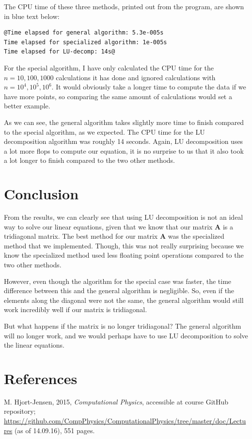\documentclass[12pt]{article}
\begin{document}
The CPU time of these three methods, printed out from the program, are shown in blue text below:
\begin{lstlisting}
@Time elapsed for general algorithm: 5.3e-005s
Time elapsed for specialized algorithm: 1e-005s
Time elapsed for LU-decomp: 14s@
\end{lstlisting}
For the special algorithm, I have only calculated the CPU time for the $n=10,100,1000$ calculations it has done and ignored calculations with $n=10^4, 10^5, 10^6$. It would obviously take a longer time to compute the data if we have more points, so comparing the same amount of calculations would set a better example.

As we can see, the general algorithm takes slightly more time to finish compared to the special algorithm, as we expected. The CPU time for the LU decomposition algorithm was roughly 14 seconds. Again, LU decomposition uses a lot more flops to compute our equation, it is no surprise to us that it also took a lot longer to finish compared to the two other methods.

\section{Conclusion}
From the results, we can clearly see that using LU decomposition is not an ideal way to solve our linear equations, given that we know that our matrix $\mathbf{A}$ is a tridiagonal matrix. The best method for our matrix $\mathbf{A}$ was the specialized method that we implemented. Though, this was not really surprising because we know the specialized method used less floating point operations compared to the two other methods. 

However, even though the algorithm for the special case was faster, the time difference between this and the general algorithm is negligible. So, even if the elements along the diagonal were not the same, the general algorithm would still work incredibly well if our matrix is tridiagonal.

But what happens if the matrix is no longer tridiagonal? The general algorithm will no longer work, and we would perhaps have to use LU decomposition to solve the linear equations.
\section{References}
M. Hjort-Jensen, 2015, \textit{Computational Physics}, accessible at course GitHub repository; \url{https://github.com/CompPhysics/ComputationalPhysics/tree/master/doc/Lectures} (as of 14.09.16), 551 pages.
\end{document}
